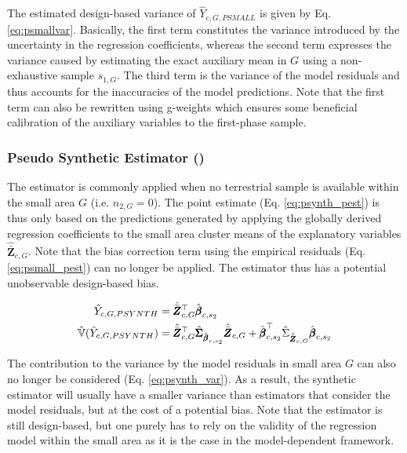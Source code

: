 The estimated design-based variance of $ \hat{Y}_{c,G,PSMALL}$ is given by Eq. \ref{eq:psmallvar}. Basically, the first term constitutes the variance introduced by the uncertainty in the regression coefficients, whereas the second term expresses the variance caused by estimating the exact auxiliary mean in $G$ using a non-exhaustive sample $s_{1,G}$. The third term is the variance of the model residuals and thus accounts for the inaccuracies of the model predictions. Note that the first term can also be rewritten using g-weights \cite[pg.14]{mandallaz2016} which ensures some beneficial calibration of the auxiliary variables to the first-phase sample.\\


\subsubsection{Pseudo Synthetic Estimator (\psynth{})}
\label{sec:psynth}

The \psynth{} estimator is commonly applied when no terrestrial sample is available within the small area $G$ (i.e. $n_{2,G}=0$). The point estimate (Eq. \ref{eq:psynth_pest}) is thus only based on the predictions generated by applying the globally derived regression coefficients to the small area cluster means of the explanatory variables $\hat{\bar{\pmb{Z}}}_{c,G}$. Note that the bias correction term using the empirical residuals (Eq. \ref{eq:psmall_pest}) can no longer be applied. The \psynth{} estimator thus has a potential unobservable design-based bias.

\begin{subequations}\label{eq:psynth}
	\begin{align}
	\hat{Y}_{c,G,PSYNTH} & =\hat{\bar{\pmb{Z}}}_{c,G}^{\top}\hat{\pmb{\beta}}_{c,s_2} \label{eq:psynth_pest} \\
	\hat{\mathbb{V}}(\hat{Y}_{c,G,PSYNTH})& =
	\hat{\bar{\pmb{Z}}}_{c,G}^{\top}\hat{\pmb{\Sigma}}_{\hat{\pmb{\beta}}_{c,s_2}}
	\hat{\bar{\pmb{Z}}}_{c,G}
	+ \hat{\pmb{\beta}}^{\top}_{c,s_2}\hat{\Sigma}_{\hat{\bar{\pmb{Z}}}_{c,G}}\hat{\pmb{\beta}}_{c,s_2} \label{eq:psynth_var}
	\end{align}
\end{subequations}

The contribution to the variance by the model residuals in small area $G$ can also no longer be considered (Eq. \ref{eq:psynth_var}). As a result, the synthetic estimator will usually have a smaller variance than estimators that consider the model residuals, but at the cost of a potential bias. Note that the \psynth{} estimator is still design-based, but one purely has to rely on the validity of the regression model within the small area as it is the case in the model-dependent framework.\\

